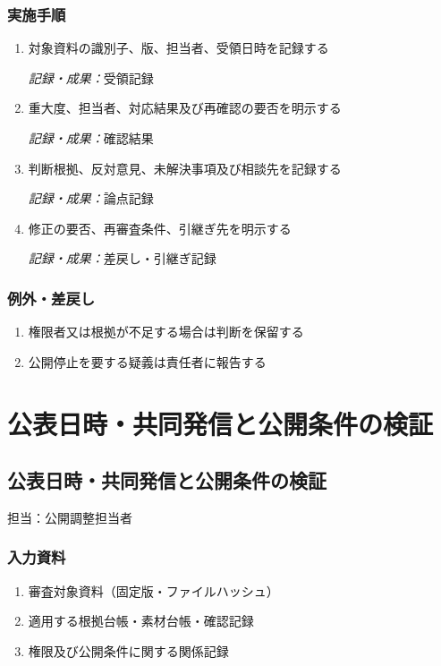 \documentclass[a4paper,11pt]{article}
\begin{document}
\subsubsection*{実施手順}
\begin{enumerate}[leftmargin=2em,itemsep=0.65em]
\item 対象資料の識別子、版、担当者、受領日時を記録する\par\noindent\textit{記録・成果：}受領記録\nobreak\smallskip
\item 重大度、担当者、対応結果及び再確認の要否を明示する\par\noindent\textit{記録・成果：}確認結果\nobreak\smallskip
\item 判断根拠、反対意見、未解決事項及び相談先を記録する\par\noindent\textit{記録・成果：}論点記録\nobreak\smallskip
\item 修正の要否、再審査条件、引継ぎ先を明示する\par\noindent\textit{記録・成果：}差戻し・引継ぎ記録\nobreak\smallskip
\end{enumerate}
\subsubsection*{例外・差戻し}
\begin{enumerate}[leftmargin=2em,itemsep=0.35em]
\item 権限者又は根拠が不足する場合は判断を保留する
\item 公開停止を要する疑義は責任者に報告する
\end{enumerate}
\section{公表日時・共同発信と公開条件の検証}
\subsection{公表日時・共同発信と公開条件の検証}
\par 担当：公開調整担当者\par\medskip
\subsubsection*{入力資料}
\begin{enumerate}[leftmargin=2em,itemsep=0.35em]
\item 審査対象資料（固定版・ファイルハッシュ）
\item 適用する根拠台帳・素材台帳・確認記録
\item 権限及び公開条件に関する関係記録
\end{enumerate}
\end{document}
